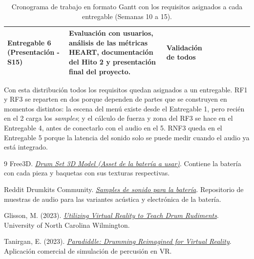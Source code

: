 \documentclass{article}
\begin{document}
\begin{table}[H]
\begin{tabular}{@{} >{\bfseries\raggedright\arraybackslash}p{} >{\raggedright\arraybackslash}p{} >{\raggedright\arraybackslash}p{} c c c c c c @{}}
Entregable 6 \newline \normalfont\footnotesize(Presentación - S15) &
Evaluación con usuarios, análisis de las métricas HEART, documentación del Hito 2 y presentación final del proyecto. &
Validación de todos &
& & & & & \rule{0.45cm}{0.28cm} \\
\bottomrule
\end{tabular}
\caption{\label{tab:gantt}Cronograma de trabajo en formato Gantt con los requisitos asignados a cada entregable (Semanas 10 a 15).}
\end{table}

Con esta distribución todos los requisitos quedan asignados a un entregable. RF1 y RF3 se reparten en dos porque dependen de partes que se construyen en momentos distintos: la escena del menú existe desde el Entregable 1, pero recién en el 2 carga los \textit{samples}; y el cálculo de fuerza y zona del RF3 se hace en el Entregable 4, antes de conectarlo con el audio en el 5. RNF3 queda en el Entregable 5 porque la latencia del sonido solo se puede medir cuando el audio ya está integrado.

\begin{thebibliography}{9}
Free3D. \href{https://free3d.com/3d-model/drum-set-99664.html}{\textit{Drum Set 3D Model (Asset de la batería a usar)}}. Contiene la batería con cada pieza y baquetas con sus texturas respectivas.

Reddit Drumkits Community. \href{https://www.reddit.com/r/Drumkits/comments/y3vqbf/every_drum_machine_since_the_1970s/}{\textit{Samples de sonido para la batería}}. Repositorio de muestras de audio para las variantes acústica y electrónica de la batería.

Glisson, M. (2023). \href{https://csbapp.uncw.edu/mscsisProceedings/2023/GlissonMorgan.pdf}{\textit{Utilizing Virtual Reality to Teach Drum Rudiments}}. University of North Carolina Wilmington.

Tanirgan, E. (2023). \href{https://paradiddleapp.com/}{\textit{Paradiddle: Drumming Reimagined for Virtual Reality}}. Aplicación comercial de simulación de percusión en VR.
\end{thebibliography}
\end{document}
